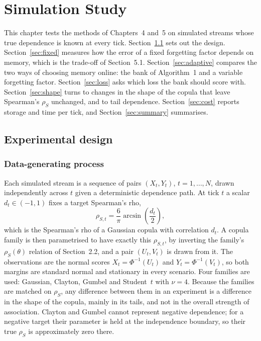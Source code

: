 \providecommand{\pending}[1]{\textcolor{red}{[#1]}}

\chapter{Simulation Study}
\label{ch:simulation}

This chapter tests the methods of Chapters~4 and~5 on simulated streams whose true dependence is
known at every tick. Section~\ref{sec:design} sets out the design. Section~\ref{sec:fixed} measures
how the error of a fixed forgetting factor depends on memory, which is the trade-off of
Section~5.1. Section~\ref{sec:adaptive} compares the two ways of choosing memory online: the bank
of Algorithm~1 and a variable forgetting factor. Section~\ref{sec:loss} asks which loss the bank
should score with. Section~\ref{sec:shape} turns to changes in the shape of the copula that leave
Spearman's $\rho_S$ unchanged, and to tail dependence. Section~\ref{sec:cost} reports storage and
time per tick, and Section~\ref{sec:summary} summarises.

\section{Experimental design}
\label{sec:design}

\subsection{Data-generating process}

Each simulated stream is a sequence of pairs $(X_t,Y_t)$, $t=1,\dots,N$, drawn independently
across $t$ given a deterministic dependence path. At tick $t$ a scalar $d_t\in(-1,1)$ fixes a
target Spearman's rho,
\[
  \rho_{S,t}=\frac{6}{\pi}\arcsin\!\left(\frac{d_t}{2}\right),
\]
which is the Spearman's rho of a Gaussian copula with correlation $d_t$. A copula family is then
parametrised to have exactly this $\rho_{S,t}$, by inverting the family's
$\rho_S(\theta)$ relation of Section~2.2, and a pair $(U_t,V_t)$ is drawn from it. The observations
are the normal scores $X_t=\Phi^{-1}(U_t)$ and $Y_t=\Phi^{-1}(V_t)$, so both margins are standard
normal and stationary in every scenario. Four families are used: Gaussian, Clayton, Gumbel and
Student~$t$ with $\nu=4$. Because the families are matched on $\rho_S$, any difference between
them in an experiment is a difference in the shape of the copula, mainly in its tails, and not in
the overall strength of association. Clayton and Gumbel cannot represent negative dependence; for
a negative target their parameter is held at the independence boundary, so their true $\rho_S$ is
approximately zero there.

